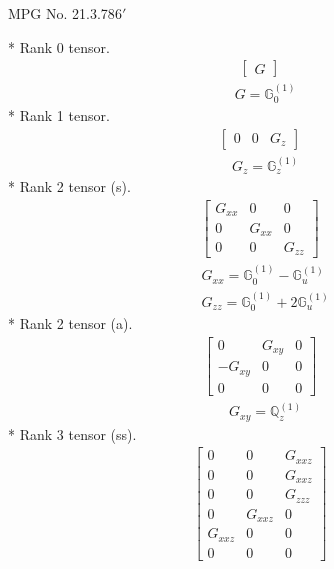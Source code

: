\documentclass[fleqn,8pt,landscape]{jsarticle}
\begin{document}
\setcounter{MaxMatrixCols}{32}

\renewcommand{\tablename}{Table~}
\renewcommand{\figurename}{Figure~}
\begin{center}
\LARGE
MPG No. 21.3.78\quad$6'$
\end{center}
* Rank 0 tensor.
\begin{align*}
\begin{bmatrix} G \end{bmatrix}
\end{align*}
\begin{align*}
& G = \mathbb{G}_{0}^{(1)}
\end{align*}
* Rank 1 tensor.
\begin{align*}
\begin{bmatrix} 0 & 0 & G_{z} \end{bmatrix}
\end{align*}
\begin{align*}
& G_{z} = \mathbb{G}_{z}^{(1)}
\end{align*}
* Rank 2 tensor (s).
\begin{align*}
\begin{bmatrix} G_{xx} & 0 & 0 \\ 0 & G_{xx} & 0 \\ 0 & 0 & G_{zz} \end{bmatrix}
\end{align*}
\begin{align*}
& G_{xx} = \mathbb{G}_{0}^{(1)} - \mathbb{G}_{u}^{(1)} \\
& G_{zz} = \mathbb{G}_{0}^{(1)} + 2 \mathbb{G}_{u}^{(1)}
\end{align*}
* Rank 2 tensor (a).
\begin{align*}
\begin{bmatrix} 0 & G_{xy} & 0 \\ - G_{xy} & 0 & 0 \\ 0 & 0 & 0 \end{bmatrix}
\end{align*}
\begin{align*}
& G_{xy} = \mathbb{Q}_{z}^{(1)}
\end{align*}
* Rank 3 tensor (ss).
\begin{align*}
\begin{bmatrix} 0 & 0 & G_{xxz} \\ 0 & 0 & G_{xxz} \\ 0 & 0 & G_{zzz} \\ 0 & G_{xxz} & 0 \\ G_{xxz} & 0 & 0 \\ 0 & 0 & 0 \end{bmatrix}
\end{align*}
\end{document}
